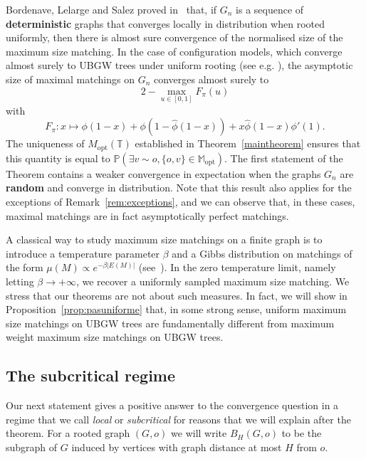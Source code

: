 \documentclass[11pt]{article}
\begin{document}
\begin{remark} \label{rem:BLS}
    Bordenave, Lelarge and Salez proved in~\cite{salez2011cavity} that, if $G_n$ is a sequence of \textbf{deterministic} graphs that converges locally in distribution when rooted uniformly, then there is almost sure convergence of the normalised size of the maximum size matching. 
    In the case of configuration models, which converge almost surely to UBGW trees under uniform rooting (see e.g. \cite{BordenaveLN}),
    the asymptotic size of maximal matchings on $G_n$ converges almost surely to \[2-\max_{u \in [0,1]}F_\pi(u)\]
    with
    \[ F_\pi: x \mapsto \phi(1-x)+\phi(1-\hat{\phi}(1-x))+x\hat{\phi}(1-x)\phi'(1). \]
    The uniqueness of $M_{\mathrm{opt}} (\mathbb T)$ established in Theorem~\ref{maintheorem} ensures that this quantity is equal to $\mathbb P \left( \exists v \sim o, \{o,v\} \in \mathbb{M}_{\mathrm{opt}} \right)$.
    The first statement of the Theorem contains a weaker convergence in expectation when the graphs $G_n$ are \textbf{random} and converge in distribution. 
    Note that this result also applies for the exceptions of Remark~\ref{rem:exceptions}, and we can observe that, in these cases, maximal matchings are in fact asymptotically perfect matchings.
\end{remark}

\begin{remark} \label{rem:uniformmatch}
A classical way to study maximum size matchings on a finite graph is to introduce a temperature parameter $\beta$ and a Gibbs distribution on matchings of the form $\mu(M) \propto e^{-\beta |E(M)| }$ (see~\cite{bordenave2012matchings}). 
In the zero temperature limit, namely letting $\beta \to +\infty$, we recover a uniformly sampled maximum size matching. 
    We stress that our theorems are not about such measures. In fact, we will show in Proposition~\ref{prop:pasuniforme} that, in some strong sense, uniform maximum size matchings on UBGW trees are fundamentally different from maximum weight maximum size matchings on UBGW trees.
\end{remark}

    
    
    \subsection{The subcritical regime} 
    
    Our next statement gives a positive answer to the convergence question in a regime that we call \textit{local} or \textit{subcritical} for reasons that we will explain after the theorem. For a rooted graph $(G,o)$ we will write $B_H(G,o)$ to be the subgraph of $G$ induced by vertices with graph distance at most $H$ from $o$.
     
\end{document}
